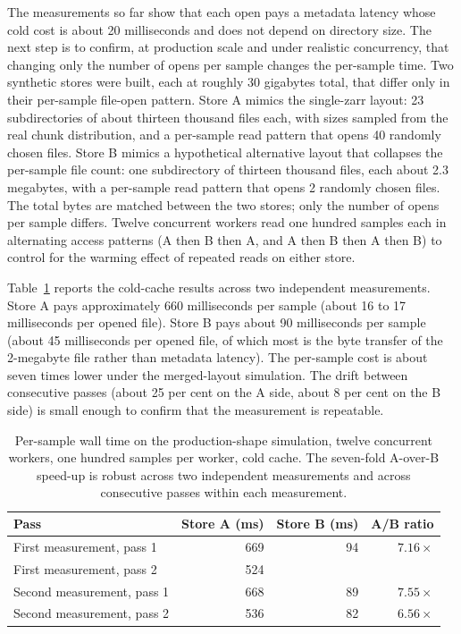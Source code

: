 \documentclass[12pt,a4paper]{article}
\begin{document}
The measurements so far show that each open pays a metadata latency whose cold cost is
about 20 milliseconds and does not depend on directory size. The next step is to confirm, at
production scale and under realistic concurrency, that changing only the number of opens per
sample changes the per-sample time. Two synthetic stores were built, each at roughly 30
gigabytes total, that differ only in their per-sample file-open pattern. Store A mimics the
single-zarr layout: 23 subdirectories of about thirteen thousand files each, with sizes
sampled from the real chunk distribution, and a per-sample read pattern that opens 40
randomly chosen files. Store B mimics a hypothetical alternative layout that collapses the
per-sample file count: one subdirectory of thirteen thousand files, each about 2.3
megabytes, with a per-sample read pattern that opens 2 randomly chosen files. The total
bytes are matched between the two stores; only the number of opens per sample differs.
Twelve concurrent workers read one hundred samples each in alternating access patterns (A
then B then A, and A then B then A then B) to control for the warming effect of repeated
reads on either store.

Table~\ref{tab:ab-cold} reports the cold-cache results across two independent measurements.
Store A pays approximately 660 milliseconds per sample (about 16 to 17 milliseconds per
opened file). Store B pays about 90 milliseconds per sample (about 45 milliseconds per
opened file, of which most is the byte transfer of the 2-megabyte file rather than
metadata latency). The per-sample cost is about seven times lower under the
merged-layout simulation. The drift between consecutive passes (about 25 per cent on the A
side, about 8 per cent on the B side) is small enough to confirm that the measurement is
repeatable.

\begin{table}[ht]
\centering
\small
\begin{tabular}{@{}lrrr@{}}
\toprule
\textbf{Pass} & \textbf{Store A (ms)} & \textbf{Store B (ms)} & \textbf{A/B ratio} \\
\midrule
First measurement, pass 1  & 669 & 94 & $7.16\times$ \\
First measurement, pass 2  & 524 &    &              \\
Second measurement, pass 1 & 668 & 89 & $7.55\times$ \\
Second measurement, pass 2 & 536 & 82 & $6.56\times$ \\
\bottomrule
\end{tabular}
\caption{Per-sample wall time on the production-shape simulation, twelve concurrent
workers, one hundred samples per worker, cold cache. The seven-fold A-over-B speed-up is
robust across two independent measurements and across consecutive passes within each
measurement.}
\label{tab:ab-cold}
\end{table}
\end{document}
